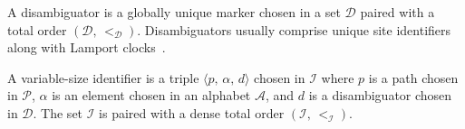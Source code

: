

\begin{definition}[Disambiguator]
  A disambiguator is a globally unique marker chosen in a set $\mathcal{D}$
  paired with a total order $(\mathcal{D},\, <_\mathcal{D})$. Disambiguators
  usually comprise unique site identifiers along with Lamport
  clocks~\cite{lamport1978time}.
\end{definition}


\begin{definition}
  A variable-size identifier is a triple $\langle p,\, \alpha,\, d \rangle$
  chosen in $\mathcal{I}$ where $p$ is a path chosen in $\mathcal{P}$, $\alpha$
  is an element chosen in an alphabet $\mathcal{A}$, and $d$ is a disambiguator
  chosen in $\mathcal{D}$. The set $\mathcal{I}$ is paired with a dense total
  order $(\mathcal{I},\,<_\mathcal{I})$.
\end{definition}

